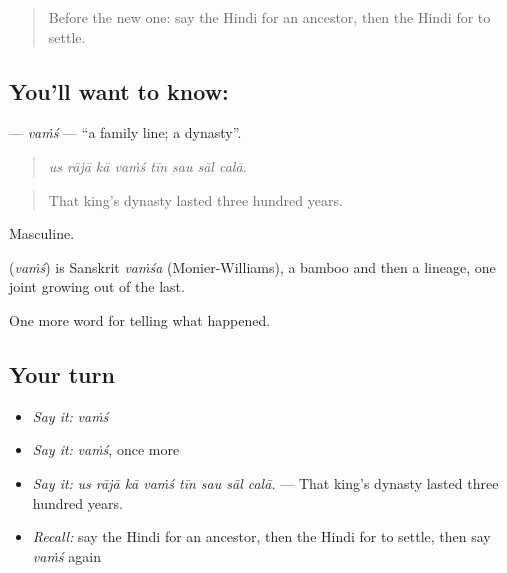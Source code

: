 \label{lesson:HI-C327-vams}



\begin{quote}
Before the new one: say the Hindi for an ancestor, then the Hindi for to settle.
\end{quote}

\subsection*{You'll want to know: }
\textbf{} — \emph{vaṁś} — \textquotedblleft{}a family line; a dynasty\textquotedblright{}.

\begin{quote}
       
\end{quote}

\begin{quote}
\emph{us rājā kā vaṁś tīn sau sāl calā.}
\end{quote}

\begin{quote}
That king's dynasty lasted three hundred years.
\end{quote}

Masculine.

\begin{cousinweb}
\textbf{} (\emph{vaṁś}) is Sanskrit \emph{vaṁśa} (Monier-Williams), a bamboo and then a lineage, one joint growing out of the last.
\end{cousinweb}

\begin{grammarlens}[title={What you've built}]
One more word for telling what happened.
\end{grammarlens}

\subsection*{Your turn}
\begin{itemize}
\raggedright
  \item \emph{Say it:} \emph{vaṁś}
  \item \emph{Say it:} \emph{vaṁś}, once more
  \item \emph{Say it:} \emph{us rājā kā vaṁś tīn sau sāl calā.} — That king's dynasty lasted three hundred years.
  \item \emph{Recall:} say the Hindi for an ancestor, then the Hindi for to settle, then say \emph{vaṁś} again
\end{itemize}

